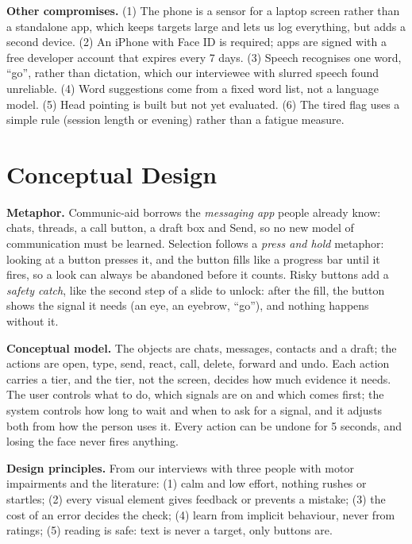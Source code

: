 \documentclass[manuscript,review]{acmart}
\begin{document}
\textbf{Other compromises.} (1) The phone is a sensor for a laptop screen rather than a standalone
app, which keeps targets large and lets us log everything, but adds a second device. (2) An iPhone
with Face ID is required; apps are signed with a free developer account that expires every 7
days. (3) Speech recognises one word, ``go'', rather than dictation, which our interviewee with
slurred speech found unreliable. (4) Word suggestions come from a fixed word list, not a language
model. (5) Head pointing is built but not yet evaluated. (6) The tired flag uses a simple rule
(session length or evening) rather than a fatigue measure.

\section{Conceptual Design}

\textbf{Metaphor.} Communic-aid borrows the \emph{messaging app} people already know: chats,
threads, a call button, a draft box and Send, so no new model of communication must be learned.
Selection follows a \emph{press and hold} metaphor: looking at a button presses it, and the button
fills like a progress bar until it fires, so a look can always be abandoned before it counts.
Risky buttons add a \emph{safety catch}, like the second step of a slide to unlock: after the fill,
the button shows the signal it needs (an eye, an eyebrow, ``go''), and nothing happens without it.

\textbf{Conceptual model.} The objects are chats, messages, contacts and a draft; the actions are
open, type, send, react, call, delete, forward and undo. Each action carries a tier, and the tier,
not the screen, decides how much evidence it needs. The user controls what to do, which signals are
on and which comes first; the system controls how long to wait and when to ask for a signal, and
it adjusts both from how the person uses it. Every action can be undone for 5 seconds, and losing
the face never fires anything.

\textbf{Design principles.} From our interviews with three people with motor impairments and the
literature: (1) calm and low effort, nothing rushes or startles; (2) every visual element gives
feedback or prevents a mistake; (3) the cost of an error decides the check; (4) learn from implicit
behaviour, never from ratings; (5) reading is safe: text is never a target, only buttons are.
\end{document}
